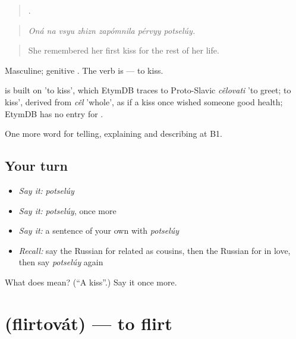 \begin{quote}
      .
\end{quote}

\begin{quote}
\emph{Oná na vsyu zhizn zapómnila pérvyy potselúy.}
\end{quote}

\begin{quote}
She remembered her first kiss for the rest of her life.
\end{quote}

Masculine; genitive . The verb is \emph{} — to kiss.

\begin{cousinweb}
\emph{} is built on \emph{} 'to kiss', which EtymDB traces to Proto-Slavic \emph{cělovati} 'to greet; to kiss', derived from \emph{cěl} 'whole', as if a kiss once wished someone good health; EtymDB has no entry for \emph{}.
\end{cousinweb}

\begin{grammarlens}[title={What you've built}]
One more word for telling, explaining and describing at B1.
\end{grammarlens}

\subsection*{Your turn}
\begin{itemize}
\raggedright
  \item \emph{Say it:} \emph{potselúy}
  \item \emph{Say it:} \emph{potselúy}, once more
  \item \emph{Say it:} a sentence of your own with \emph{potselúy}
  \item \emph{Recall:} say the Russian for related as cousins, then the Russian for in love, then say \emph{potselúy} again
\end{itemize}

\begin{tcolorbox}[breakable,colback=teal!4,colframe=teal!35!black,title={Before you move on}]
What does  mean? (\textquotedblleft{}A kiss\textquotedblright{}.) Say it once more.
\end{tcolorbox}
\section[\texorpdfstring{\ru{флиртовать} (flirtovát)}{флиртовать (flirtovát)}]{ (flirtovát) — to flirt}

